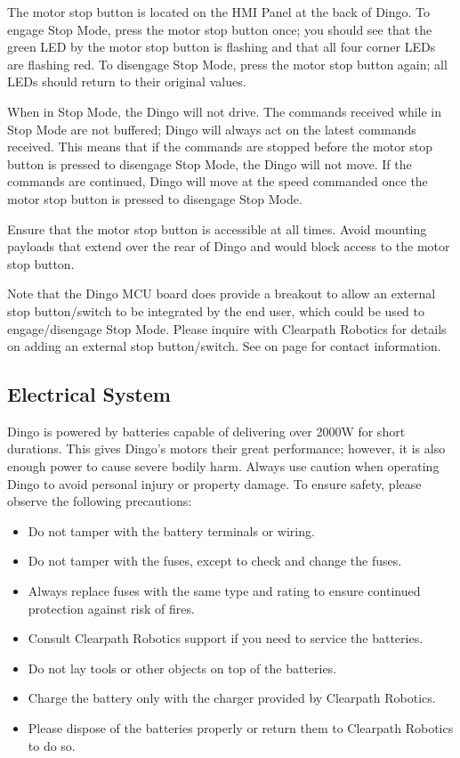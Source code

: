 \documentclass[]{clearpath-latex/clearpath-manual}
\begin{document}
The motor stop button  is located on the HMI Panel at the back of Dingo. To engage Stop Mode, press the motor stop button once; you should see that the green LED by the motor stop button is flashing and that all four corner LEDs are flashing red. To disengage Stop Mode, press the motor stop button again; all LEDs should return to their original values.

When in Stop Mode, the Dingo will not drive. The commands received while in Stop Mode are not buffered; Dingo will always act on the latest commands received. This means that if the commands are stopped before the motor stop button is pressed to disengage Stop Mode, the Dingo will not move. If the commands are continued, Dingo will move at the speed commanded once the motor stop button is pressed to disengage Stop Mode.

Ensure that the motor stop button is accessible at all times. Avoid mounting payloads that extend over the rear of Dingo and would block access to the motor stop button.

Note that the Dingo MCU board does provide a breakout to allow an external stop button/switch to be integrated by the end user, which could be used to engage/disengage Stop Mode. Please inquire with Clearpath Robotics for details on adding an external stop button/switch. See  on page \pageref{contact} for contact information.

\subsection{Electrical System}

Dingo is powered by batteries capable of delivering over 2000W for short durations. This gives Dingo's motors their great performance; however, it is also enough power to cause severe bodily harm. Always use caution when operating Dingo to avoid personal injury or property damage.  To ensure safety, please observe the following precautions:

\begin{itemize}[nolistsep]
	\item Do not tamper with the battery terminals or wiring.
	\item Do not tamper with the fuses, except to check and change the fuses.
	\item Always replace fuses with the same type and rating to ensure continued protection against risk of fires.
	\item Consult Clearpath Robotics support if you need to service the batteries.
	\item Do not lay tools or other objects on top of the batteries.
	\item Charge the battery only with the charger provided by Clearpath Robotics.
	\item Please dispose of the batteries properly or return them to Clearpath Robotics to do so.
\end{itemize}
\end{document}
